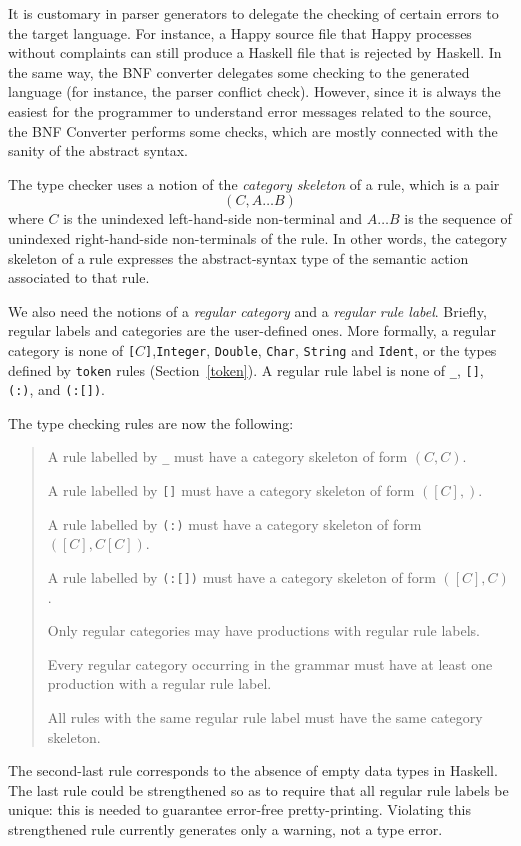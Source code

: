 \documentclass[10pt]{article}
\newcommand{\bequ}{\begin{quote}}
\newcommand{\enqu}{\end{quote}}
\begin{document}
\label{typecheck}

It is customary in parser generators to delegate the checking of certain
errors to the target language. For instance, a Happy source file that
Happy processes without complaints can still produce a Haskell file
that is rejected by Haskell. In the same way, the BNF converter
delegates some checking to the generated language (for instance,
the parser conflict check). However, since it is always
the easiest for the programmer to understand error messages
related to the source, the BNF Converter performs some checks,
which are mostly connected with the sanity of the abstract syntax.

The type checker uses a notion of the 
\textit{category skeleton} of a rule, which is a pair 
\[
  (C, A\ldots B)
\]
where $C$ is the unindexed left-hand-side non-terminal and $A\ldots B$
is the sequence of unindexed right-hand-side non-terminals of the rule. 
In other words, the category skeleton of a rule expresses the abstract-syntax
type of the semantic action associated to that rule.

We also need the notions of
a \textit{regular category} and
a \textit{regular rule label}.
Briefly, regular labels and categories are the user-defined ones.
More formally,
a regular category is none of
{\tt[}$C${\tt]},{\tt Integer}, {\tt Double}, {\tt Char}, {\tt String}
and {\tt Ident}, or the types defined by {\tt token} rules (Section~\ref{token}).
A regular rule label is none of
{\tt \_}, {\tt []}, {\tt (:)}, and {\tt (:[])}. 

The type checking rules are now the following:
\bequ
A rule labelled by {\tt \_} must have a category skeleton of form $(C,C)$.

A rule labelled by {\tt []} must have a category skeleton of form $([C],)$.
 
A rule labelled by {\tt (:)} must have a category skeleton of form $([C],C[C])$.

A rule labelled by {\tt (:[])} must have a category skeleton of form $([C],C)$.

Only regular categories may have productions with regular rule labels.

Every regular category occurring in the grammar
must have at least one production with a regular rule label.

All rules with the same regular rule label must have the same
category skeleton.
\enqu
The second-last rule corresponds to the absence of empty data types in Haskell.
The last rule could 
be strengthened so as to require that all regular rule labels be unique: 
this is needed to guarantee error-free pretty-printing. 
Violating this strengthened rule currently
generates only a warning, not a type error.
\end{document}
